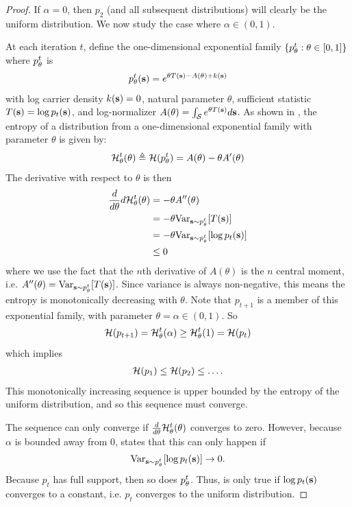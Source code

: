 \begin{proof}
If $\alpha = 0$, then $p_2$ (and all subsequent distributions) will clearly be the uniform distribution.
We now study the case where $\alpha \in (0, 1)$.

At each iteration $t$, define the one-dimensional exponential family $\{{p_\theta^t} : \theta \in [0, 1]\}$ where ${p_\theta^t}$ is
\begin{align*}
    {p_\theta^t}(\mathbf{s}) = e^{\theta T(\mathbf{s}) - A(\theta) + k(\mathbf{s})}
\end{align*}
with log carrier density $k(\mathbf{s}) = 0$, natural parameter $\theta$, sufficient statistic $T(\mathbf{s}) = \log p_t(\mathbf{s})$, and log-normalizer $A(\theta) = \int_{{\mathcal{S}}} e^{\theta T(\mathbf{s})} d\mathbf{s}$.
As shown in \cite{nielsen2010entropies}, the entropy of a distribution from a one-dimensional exponential family with parameter $\theta$ is given by:
\begin{align*}
    {{\mathcal{H}}_\theta^t}(\theta) \triangleq {\mathcal{H}}({p_\theta^t}) = A(\theta) - \theta A'(\theta)
\end{align*}
The derivative with respect to $\theta$ is then
\begin{align}\nonumber
    \frac{d}{d \theta}d{{\mathcal{H}}_\theta^t}(\theta)
        &= - \theta A''(\theta)\\\nonumber
        &= - \theta \mathrm{Var}_{\mathbf{s} \sim {p_\theta^t}}[T(\mathbf{s})]\\\label{eq:easy-variance-case}
        &= - \theta \mathrm{Var}_{\mathbf{s} \sim {p_\theta^t}}[\log p_t(\mathbf{s})]\\\nonumber
        &\leq 0
\end{align}
where we use the fact that the $n$th derivative of $A(\theta)$ is the $n$ central moment, i.e. $A''(\theta) = \mathrm{Var}_{\mathbf{s} \sim {p_\theta^t}}[T(\mathbf{s})]$.
Since variance is always non-negative, this means the entropy is monotonically decreasing with $\theta$.
Note that $p_{t+1}$ is a member of this exponential family, with parameter $\theta = \alpha \in (0, 1)$.
So
\begin{align*}
    {\mathcal{H}}(p_{t+1}) = {{\mathcal{H}}_\theta^t}(\alpha) \geq {{\mathcal{H}}_\theta^t}(1) = {\mathcal{H}}(p_t)
\end{align*}
which implies
\begin{align*}
    {\mathcal{H}}(p_1) \leq {\mathcal{H}}(p_2) \leq \dots.
\end{align*}
This monotonically increasing sequence is upper bounded by the entropy of the uniform distribution, and so this sequence must converge.

The sequence can only converge if $\frac{d}{d \theta} {{\mathcal{H}}_\theta^t}(\theta)$ converges to zero.
However, because $\alpha$ is bounded away from $0$,  states that this can only happen if
\begin{align}\label{eq:easy-logprob-becomes-constant}
    \mathrm{Var}_{\mathbf{s} \sim {p_\theta^t}}[\log p_t(\mathbf{s})] \rightarrow 0.
\end{align}
Because $p_t$ has full support, then so does ${p_\theta^t}$.
Thus,  is only true if $\log p_t(\mathbf{s})$ converges to a constant, i.e. $p_t$ converges to the uniform distribution.
\end{proof}

